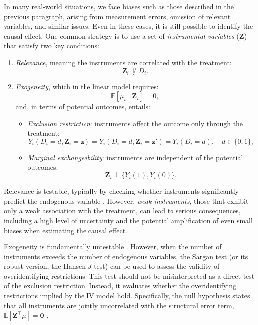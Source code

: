In many real-world situations, we face biases such as those described in the previous paragraph, arising from measurement errors, omission of relevant variables, and similar issues. Even in these cases, it is still possible to identify the causal effect. One common strategy is to use a set of \textit{instrumental variables} ($\mathbf{Z}$) that satisfy two key conditions:
\begin{enumerate}
	\item \textit{Relevance}, meaning the instruments are correlated with the treatment:
	\[
	\mathbf{Z}_i \not\perp D_i.
	\]
	\item \textit{Exogeneity}, which in the linear model requires:
	\begin{equation}\label{eq:12_3}
		\mathbb{E}[\mu_i \mid \mathbf{Z}_i] = 0,
	\end{equation}
	and, in terms of potential outcomes, entails:
	\begin{itemize}
		\item \textit{Exclusion restriction}: instruments affect the outcome only through the treatment:
		\[
		Y_i(D_i = d, \mathbf{Z}_i = \mathbf{z}) = Y_i(D_i = d, \mathbf{Z}_i = \mathbf{z}') = Y_i(D_i = d), \quad d \in \{0,1\},
		\]
		\item \textit{Marginal exchangeability}: instruments are independent of the potential outcomes:
		\[
		\mathbf{Z}_i \perp \{ Y_i(1), Y_i(0) \}.
		\]
	\end{itemize}
\end{enumerate}

Relevance is testable, typically by checking whether instruments significantly predict the endogenous variable \cite{staiger1997instrumental,cragg1993testing,kleibergen2006generalized,stock2005asymptotic}. However, \textit{weak instruments}, those that exhibit only a weak association with the treatment, can lead to serious consequences, including a high level of uncertainty and the potential amplification of even small biases when estimating the causal effect.

Exogeneity is fundamentally untestable \cite{imbens1994identification}. However, when the number of instruments exceeds the number of endogenous variables, the Sargan test (or its robust version, the Hansen $J$-test) can be used to assess the validity of overidentifying restrictions. This test should not be misinterpreted as a direct test of the exclusion restriction. Instead, it evaluates whether the overidentifying restrictions implied by the IV model hold. Specifically, the null hypothesis states that all instruments are jointly uncorrelated with the structural error term, $\mathbb{E}[\mathbf{Z}^\top \mu] = \mathbf{0}$ \cite{sargan1958econometric,hansen1982large}. 

